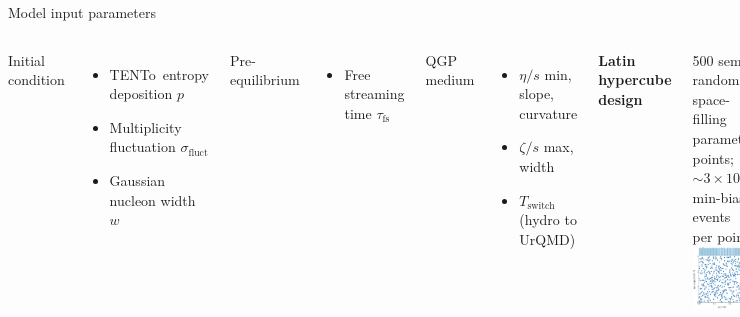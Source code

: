 \documentclass{beamer}
\newcommand{\trento}{T\raisebox{-0.3ex}{R}ENTo}
\begin{document}
\begin{frame}{Model input parameters}
  \begin{columns}
    Initial condition
    \begin{itemize}
      \item \trento\ entropy deposition $p$
      \item Multiplicity fluctuation $\sigma_\text{fluct}$
      \item Gaussian nucleon width $w$
    \end{itemize}
    \medskip
    Pre-equilibrium
    \begin{itemize}
      \item Free streaming time $\tau_\text{fs}$
    \end{itemize}
    \medskip
    QGP medium
    \begin{itemize}
      \item $\eta/s$ min, slope, curvature
      \item $\zeta/s$ max, width
      \item $T_\text{switch}$ (hydro to UrQMD)
    \end{itemize}
    \begin{center}
      \textbf{Latin hypercube design}
    \end{center}
    500 semi-random, space-filling parameter points;
    ${\sim}3 \times 10^4$ min-bias events per point \\[1em]
    \includegraphics{design}
  \end{columns}
\end{frame}
\end{document}

